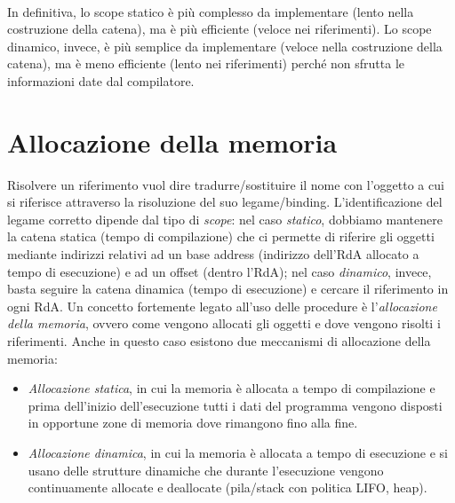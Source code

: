 \documentclass[a4paper,oneside,titlepage]{book}
\begin{document}
\\
In definitiva, lo scope statico è più complesso da implementare (lento nella costruzione della catena), ma è più efficiente (veloce nei riferimenti). Lo scope dinamico, invece, è più semplice da implementare (veloce nella costruzione della catena), ma è meno efficiente (lento nei riferimenti) perché non sfrutta le informazioni date dal compilatore.

\section{Allocazione della memoria}
Risolvere un riferimento vuol dire tradurre/sostituire il nome con l'oggetto a cui si riferisce attraverso la risoluzione del suo legame/binding. L'identificazione del legame corretto dipende dal tipo di \textit{scope}: nel caso \textit{statico}, dobbiamo mantenere la catena statica (tempo di compilazione) che ci permette di riferire gli oggetti mediante indirizzi relativi ad un base address (indirizzo dell'RdA allocato a tempo di esecuzione) e ad un offset (dentro l'RdA); nel caso \textit{dinamico}, invece, basta seguire la catena dinamica (tempo di esecuzione) e cercare il riferimento in ogni RdA. Un concetto fortemente legato all'uso delle procedure è l'\textit{allocazione della memoria}, ovvero come vengono allocati gli oggetti e dove vengono risolti i riferimenti.
\newpage
\noindent
Anche in questo caso esistono due meccanismi di allocazione della memoria:
\begin{itemize}
	\item \textit{Allocazione statica}, in cui la memoria è allocata a tempo di compilazione e prima dell'inizio dell'esecuzione tutti i dati del programma vengono disposti in opportune zone di memoria dove rimangono fino alla fine.
	\item \textit{Allocazione dinamica}, in cui la memoria è allocata a tempo di esecuzione e si usano delle strutture dinamiche che durante l'esecuzione vengono continuamente allocate e deallocate (pila/stack con politica LIFO, heap).
\end{itemize}
\end{document}
